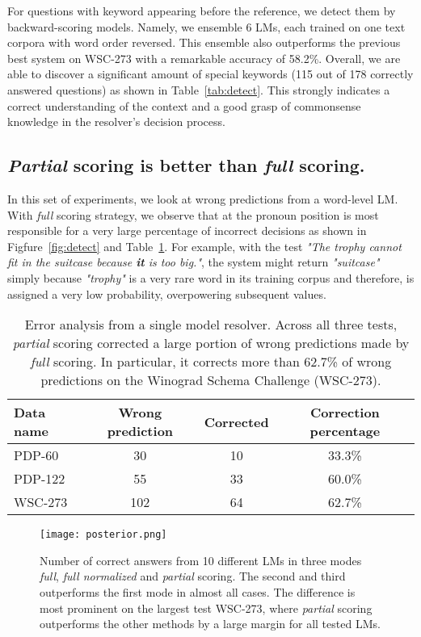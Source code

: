 \documentclass{article}
\begin{document}
For questions with keyword appearing before the reference, we detect them by backward-scoring models. Namely, we ensemble 6 LMs, each trained on one text corpora with word order reversed. This ensemble also outperforms the previous best system on WSC-273 with a remarkable accuracy of 58.2\%. Overall, we are able to discover a significant amount of special keywords (115 out of 178 correctly answered questions) as shown in Table~\ref{tab:detect}. This strongly indicates a correct understanding of the context and a good grasp of commonsense knowledge in the resolver's decision process.


\subsection{\emph{Partial} scoring is better than \emph{full} scoring.} \label{sec:better_partial}

In this set of experiments, we look at wrong predictions from a word-level LM. With \emph{full} scoring strategy, we observe that  at the pronoun position is most responsible for a very large percentage of incorrect decisions as shown in Figfure~\ref{fig:detect} and Table~\ref{tab:parts}. For example, with the test {\it "The trophy cannot fit in the suitcase because \textbf{it} is too big."}, the system might return {\it "suitcase"} simply because {\it  "trophy"} is a very rare word in its training corpus and therefore, is assigned a very low probability, overpowering subsequent  values. 

\begin{table}[h!]
  \caption{Error analysis from a single model resolver. Across all three tests, \emph{partial} scoring corrected a large portion of wrong predictions made by \emph{full} scoring. In particular, it corrects more than 62.7\% of wrong predictions on the Winograd Schema Challenge (WSC-273).}
  \label{tab:parts}
  \centering
  \small
  \begin{tabular}{lccc}
    \toprule
    \textbf{Data name} & \textbf{Wrong prediction} & \textbf{Corrected} & \textbf{Correction percentage} \\
    \midrule
    PDP-60 &  30 &  10  & 33.3\% \\
    PDP-122 &  55 &  33  & 60.0\% \\
    WSC-273 & 102  &  64 & 62.7\% \\
    \bottomrule
  \end{tabular}
\end{table}


\begin{figure}[h!]
\centering
\texttt{[image: posterior.png]}
\caption{Number of correct answers from 10 different LMs in three modes \emph{full}, \emph{full normalized} and \emph{partial} scoring. The second and third outperforms the first mode in almost all cases. The difference is most prominent on the largest test WSC-273, where \emph{partial} scoring outperforms the other methods by a large margin for all tested LMs.}
\label{fig:scoring}
\end{figure}
\end{document}
